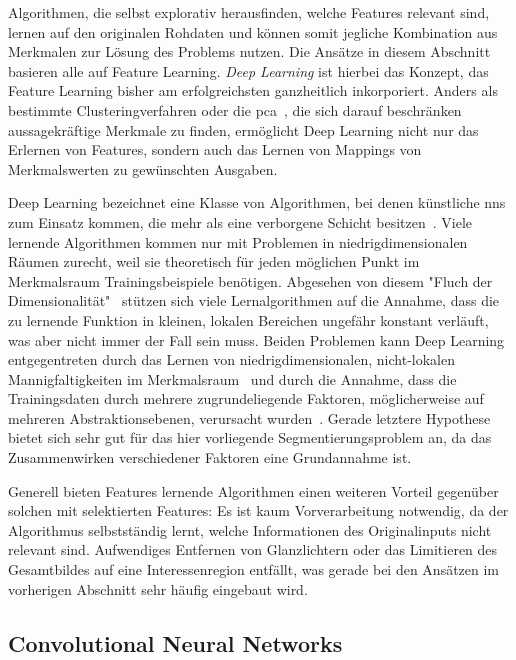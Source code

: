 Algorithmen, die selbst explorativ herausfinden, welche Features relevant sind, lernen auf den originalen Rohdaten und können somit jegliche Kombination aus Merkmalen zur Lösung des Problems nutzen.
Die Ansätze in diesem Abschnitt basieren alle auf Feature Learning.
\emph{Deep Learning} ist hierbei das Konzept, das Feature Learning bisher am erfolgreichsten ganzheitlich inkorporiert.
Anders als bestimmte Clusteringverfahren oder die \gls{pca}~\cite{Hotelling.1933}, die sich darauf beschränken aussagekräftige Merkmale zu finden, ermöglicht Deep Learning nicht nur das Erlernen von Features, sondern auch das Lernen von Mappings von Merkmalswerten zu gewünschten Ausgaben.

Deep Learning bezeichnet eine Klasse von Algorithmen, bei denen künstliche \glspl{nn} zum Einsatz kommen, die mehr als eine verborgene Schicht besitzen~\cite{Goodfellow.2016}.
Viele lernende Algorithmen kommen nur mit Problemen in niedrigdimensionalen Räumen zurecht, weil sie theoretisch für jeden möglichen Punkt im Merkmalsraum Trainingsbeispiele benötigen.
Abgesehen von diesem "Fluch der Dimensionalität"~\cite{Bellman.2010} stützen sich viele Lernalgorithmen auf die Annahme, dass die zu lernende Funktion in kleinen, lokalen Bereichen ungefähr konstant verläuft, was aber nicht immer der Fall sein muss.
Beiden Problemen kann Deep Learning entgegentreten durch das Lernen von niedrigdimensionalen, nicht-lokalen Mannigfaltigkeiten im Merkmalsraum~\cite{Bengio.2005} und durch die Annahme, dass die Trainingsdaten durch mehrere zugrundeliegende Faktoren, möglicherweise auf mehreren Abstraktionsebenen, verursacht wurden~\cite{Goodfellow.2016}.
Gerade letztere Hypothese bietet sich sehr gut für das hier vorliegende Segmentierungsproblem an, da das Zusammenwirken verschiedener Faktoren eine Grundannahme ist.

Generell bieten Features lernende Algorithmen einen weiteren Vorteil gegenüber solchen mit selektierten Features:
Es ist kaum Vorverarbeitung notwendig, da der Algorithmus selbstständig lernt, welche Informationen des Originalinputs nicht relevant sind.
Aufwendiges Entfernen von Glanzlichtern oder das Limitieren des Gesamtbildes auf eine Interessenregion entfällt, was gerade bei den Ansätzen im vorherigen Abschnitt sehr häufig eingebaut wird.



\subsection{Convolutional Neural Networks}

